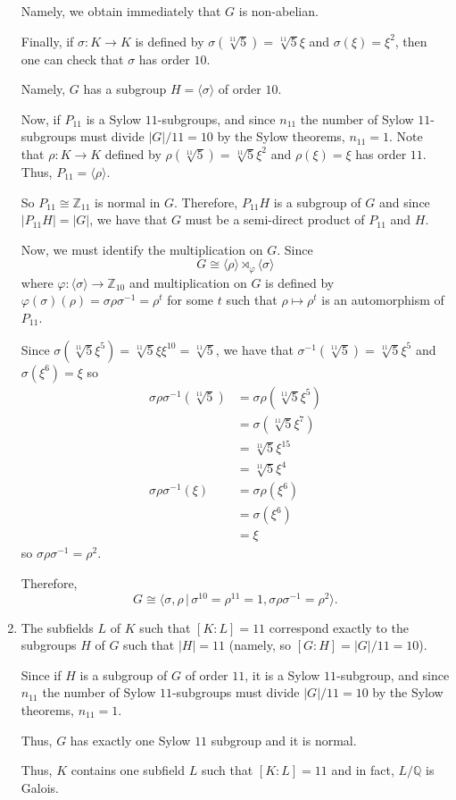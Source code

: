 \documentclass[12pt]{Qual}
\begin{document}
\begin{solution}
\begin{enumerate}[label=(\alph*)]
    Namely, we obtain immediately that $G$ is non-abelian.

    Finally, if $\sigma:K\to K$ is defined by $\sigma(\sqrt[11]{5})=\sqrt[11]{5}\xi$ and $\sigma(\xi)=\xi^2$, then one can check that $\sigma$ has order $10$.

    Namely, $G$ has a subgroup $H=\langle\sigma\rangle$ of order $10$.

    Now, if $P_{11}$ is a Sylow $11$-subgroups, and since $n_{11}$ the number of Sylow $11$-subgroups must divide $|G|/11=10$ by the Sylow theorems, $n_{11}=1$. Note that $\rho:K\to K$ defined by $\rho(\sqrt[11]{5})=\sqrt[11]{5}\xi^2$ and $\rho(\xi)=\xi$ has order $11$. Thus, $P_{11}=\langle \rho\rangle.$

    So $P_{11}\cong\mathbb{Z}_{11}$ is normal in $G$. Therefore, $P_{11}H$ is a subgroup of $G$ and since $|P_{11}H|=|G|$, we have that $G$ must be a semi-direct product of $P_{11}$ and $H$.

    Now, we must identify the multiplication on $G$. Since $$G\cong \langle \rho\rangle\rtimes_\varphi \langle\sigma\rangle$$ where $\varphi:\langle \sigma\rangle\to\mathbb{Z}_{10}$ and multiplication on $G$ is defined by $\varphi(\sigma)(\rho)=\sigma\rho\sigma^{-1}=\rho^t$ for some $t$ such that $\rho\mapsto \rho^t$ is an automorphism of $P_{11}$.

    Since $\sigma(\sqrt[11]{5}\xi^5)=\sqrt[11]{5}\xi\xi^{10}=\sqrt[11]{5}$, we have that $\sigma^{-1}(\sqrt[11]{5})=\sqrt[11]{5}\xi^5$ and $\sigma(\xi^6)=\xi$ so  \begin{align*}
        \sigma\rho\sigma^{-1}(\sqrt[11]{5})&=\sigma\rho(\sqrt[11]{5}\xi^5)\\
        &=\sigma(\sqrt[11]{5}\xi^7)\\
        &=\sqrt[11]{5}\xi^{15}\\
        &=\sqrt[11]{5}\xi^4\\
        \sigma\rho\sigma^{-1}(\xi)&=\sigma\rho(\xi^6)\\
        &=\sigma(\xi^6)\\
        &=\xi
    \end{align*} so $\sigma\rho\sigma^{-1}=\rho^2.$

    Therefore, $$G\cong\langle \sigma,\rho\,|\,\sigma^{10}=\rho^{11}=1,\sigma\rho\sigma^{-1}=\rho^2\rangle.$$

    \item The subfields $L$ of $K$ such that $[K:L]=11$ correspond exactly to the subgroups $H$ of $G$ such that $|H|=11$ (namely, so $[G:H]=|G|/11=10$).

    Since if $H$ is a subgroup of $G$ of order $11$, it is a Sylow $11$-subgroup, and since $n_{11}$ the number of Sylow $11$-subgroups must divide $|G|/11=10$ by the Sylow theorems, $n_{11}=1$.

    Thus, $G$ has exactly one Sylow $11$ subgroup and it is normal.

    Thus, $K$ contains one subfield $L$ such that $[K:L]=11$ and in fact, $L/\mathbb{Q}$ is Galois.
\end{enumerate}
\end{solution}
\newpage
\end{document}
